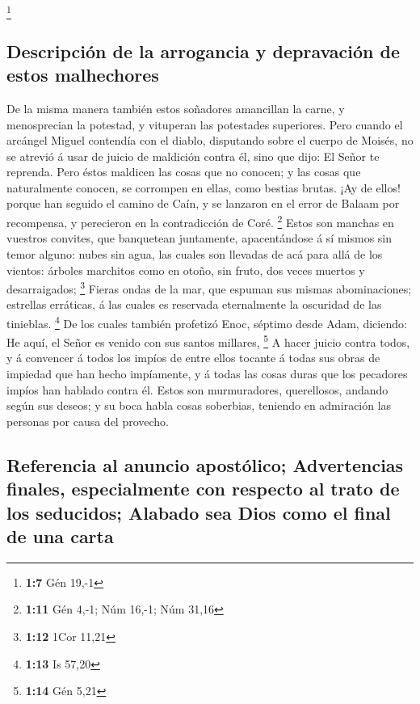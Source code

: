 \footnote{\textbf{1:7} Gén 19,-1}

\hypertarget{descripciuxf3n-de-la-arrogancia-y-depravaciuxf3n-de-estos-malhechores}{%
\subsection{Descripción de la arrogancia y depravación de estos
malhechores}\label{descripciuxf3n-de-la-arrogancia-y-depravaciuxf3n-de-estos-malhechores}}

 De la misma manera también estos soñadores amancillan la
carne, y menosprecian la potestad, y vituperan las potestades
superiores.  Pero cuando el arcángel Miguel contendía con el
diablo, disputando sobre el cuerpo de Moisés, no se atrevió á usar de
juicio de maldición contra él, sino que dijo: El Señor te reprenda.
 Pero éstos maldicen las cosas que no conocen; y las cosas
que naturalmente conocen, se corrompen en ellas, como bestias brutas.
 ¡Ay de ellos! porque han seguido el camino de Caín, y se
lanzaron en el error de Balaam por recompensa, y perecieron en la
contradicción de Coré. \footnote{\textbf{1:11} Gén 4,-1; Núm 16,-1; Núm
  31,16}  Estos son manchas en vuestros convites, que
banquetean juntamente, apacentándose á sí mismos sin temor alguno: nubes
sin agua, las cuales son llevadas de acá para allá de los vientos:
árboles marchitos como en otoño, sin fruto, dos veces muertos y
desarraigados; \footnote{\textbf{1:12} 1Cor 11,21}  Fieras
ondas de la mar, que espuman sus mismas abominaciones; estrellas
erráticas, á las cuales es reservada eternalmente la oscuridad de las
tinieblas. \footnote{\textbf{1:13} Is 57,20}  De los cuales
también profetizó Enoc, séptimo desde Adam, diciendo: He aquí, el Señor
es venido con sus santos millares, \footnote{\textbf{1:14} Gén 5,21}
 A hacer juicio contra todos, y á convencer á todos los
impíos de entre ellos tocante á todas sus obras de impiedad que han
hecho impíamente, y á todas las cosas duras que los pecadores impíos han
hablado contra él.  Estos son murmuradores, querellosos,
andando según sus deseos; y su boca habla cosas soberbias, teniendo en
admiración las personas por causa del provecho.

\hypertarget{referencia-al-anuncio-apostuxf3lico-advertencias-finales-especialmente-con-respecto-al-trato-de-los-seducidos-alabado-sea-dios-como-el-final-de-una-carta}{%
\subsection{Referencia al anuncio apostólico; Advertencias finales,
especialmente con respecto al trato de los seducidos; Alabado sea Dios
como el final de una
carta}\label{referencia-al-anuncio-apostuxf3lico-advertencias-finales-especialmente-con-respecto-al-trato-de-los-seducidos-alabado-sea-dios-como-el-final-de-una-carta}}

